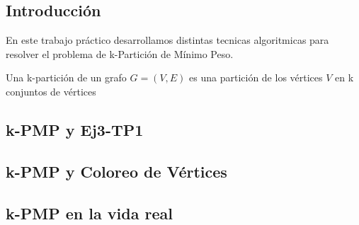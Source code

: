 \subsection{Introducción}
En este trabajo práctico desarrollamos distintas tecnicas algoritmicas para resolver el problema de k-Partición de Mínimo Peso.

Una k-partición de un grafo $G = (V, E)$ es una partición de los vértices $V$ en k conjuntos de vértices

\newpage
\subsection{k-PMP y Ej3-TP1}

\newpage
\subsection{k-PMP y Coloreo de Vértices}

\newpage
\subsection{k-PMP en la vida real}
